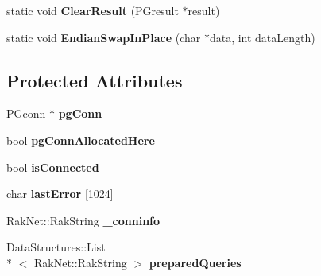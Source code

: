 \begin{DoxyCompactItemize}
\item 
\hypertarget{class_postgre_s_q_l_interface_ad3550c7f2e456f1a09853b89000b21e9}{static void {\bfseries Clear\-Result} (P\-Gresult $\ast$result)}\label{class_postgre_s_q_l_interface_ad3550c7f2e456f1a09853b89000b21e9}

\item 
\hypertarget{class_postgre_s_q_l_interface_af0d28146e00eda541a99de0d996cbac0}{static void {\bfseries Endian\-Swap\-In\-Place} (char $\ast$data, int data\-Length)}\label{class_postgre_s_q_l_interface_af0d28146e00eda541a99de0d996cbac0}

\end{DoxyCompactItemize}
\subsection*{Protected Attributes}
\begin{DoxyCompactItemize}
\item 
\hypertarget{class_postgre_s_q_l_interface_aed1562ab662411b710ac7003a4697085}{P\-Gconn $\ast$ {\bfseries pg\-Conn}}\label{class_postgre_s_q_l_interface_aed1562ab662411b710ac7003a4697085}

\item 
\hypertarget{class_postgre_s_q_l_interface_a2f23287b2d17fe6902549392904e4844}{bool {\bfseries pg\-Conn\-Allocated\-Here}}\label{class_postgre_s_q_l_interface_a2f23287b2d17fe6902549392904e4844}

\item 
\hypertarget{class_postgre_s_q_l_interface_aaed5d03c2fe13ff00c140849ff6364fc}{bool {\bfseries is\-Connected}}\label{class_postgre_s_q_l_interface_aaed5d03c2fe13ff00c140849ff6364fc}

\item 
\hypertarget{class_postgre_s_q_l_interface_a51530dd58dcbac4c3098eccf14f3ce58}{char {\bfseries last\-Error} \mbox{[}1024\mbox{]}}\label{class_postgre_s_q_l_interface_a51530dd58dcbac4c3098eccf14f3ce58}

\item 
\hypertarget{class_postgre_s_q_l_interface_a7dccfb2b0d6f0c6e8474ea93267b4fd9}{Rak\-Net\-::\-Rak\-String {\bfseries \-\_\-conninfo}}\label{class_postgre_s_q_l_interface_a7dccfb2b0d6f0c6e8474ea93267b4fd9}

\item 
\hypertarget{class_postgre_s_q_l_interface_a24c3250d109386c28982940150bbc51f}{Data\-Structures\-::\-List\\*
$<$ Rak\-Net\-::\-Rak\-String $>$ {\bfseries prepared\-Queries}}\label{class_postgre_s_q_l_interface_a24c3250d109386c28982940150bbc51f}

\end{DoxyCompactItemize}


